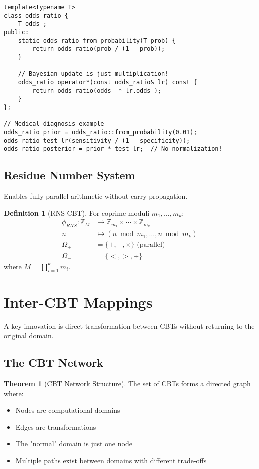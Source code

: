 \documentclass[12pt,a4paper]{article}
\theoremstyle{definition}
\newtheorem{definition}{Definition}
\newtheorem{theorem}{Theorem}
\begin{document}
\begin{lstlisting}[caption={Bayesian inference via odds-ratio}]
template<typename T>
class odds_ratio {
    T odds_;
public:
    static odds_ratio from_probability(T prob) {
        return odds_ratio(prob / (1 - prob));
    }
    
    // Bayesian update is just multiplication!
    odds_ratio operator*(const odds_ratio& lr) const {
        return odds_ratio(odds_ * lr.odds_);
    }
};

// Medical diagnosis example
odds_ratio prior = odds_ratio::from_probability(0.01);
odds_ratio test_lr(sensitivity / (1 - specificity));
odds_ratio posterior = prior * test_lr;  // No normalization!
\end{lstlisting}

\subsection{Residue Number System}

Enables fully parallel arithmetic without carry propagation.

\begin{definition}[RNS CBT]
For coprime moduli $m_1, \ldots, m_k$:
\begin{align}
\phi_{RNS}: \mathbb{Z}_M &\to \mathbb{Z}_{m_1} \times \cdots \times \mathbb{Z}_{m_k} \\
n &\mapsto (n \bmod m_1, \ldots, n \bmod m_k) \\
\Omega_+ &= \{+, -, \times\} \text{ (parallel)} \\
\Omega_- &= \{<, >, \div\}
\end{align}
where $M = \prod_{i=1}^k m_i$.
\end{definition}

\section{Inter-CBT Mappings}

A key innovation is direct transformation between CBTs without returning to the original domain.

\subsection{The CBT Network}

\begin{theorem}[CBT Network Structure]
The set of CBTs forms a directed graph where:
\begin{itemize}
\item Nodes are computational domains
\item Edges are transformations
\item The "normal" domain is just one node
\item Multiple paths exist between domains with different trade-offs
\end{itemize}
\end{theorem}
\end{document}
